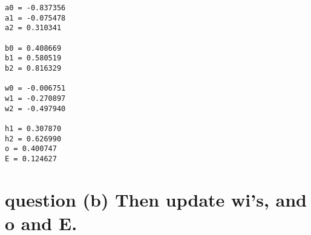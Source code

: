 \documentclass[11pt]{article}
\begin{document}
    \begin{Verbatim}[commandchars=\\\{\}]
a0 = -0.837356
a1 = -0.075478
a2 = 0.310341

b0 = 0.408669
b1 = 0.580519
b2 = 0.816329

w0 = -0.006751
w1 = -0.270897
w2 = -0.497940

h1 = 0.307870
h2 = 0.626990
o = 0.400747
E = 0.124627

    \end{Verbatim}
\newpage
    \section{\texorpdfstring{question (b) Then update wi's, and o and
E.}{question (b)   Then update wi's, and o and E.}}\label{question-b-then-update-wis-and-o-and-e.}
\end{document}
